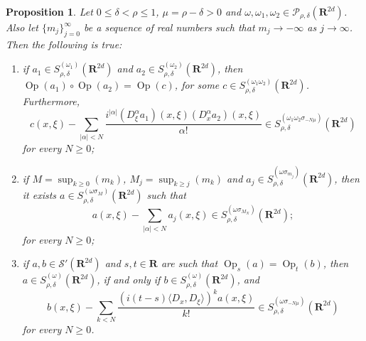 \documentclass[12pt,a4paper,reqno]{amsart}
\numberwithin{equation}{section}
\numberwithin{thm}{section}
\newtheorem{prop}[thm]{Proposition}
\theoremstyle{definition}
\theoremstyle{remark}
\begin{document}
\begin{prop}\label{pseudocomp}
Let  $0\le \delta <\rho \le 1$, $\mu =\rho -\delta >0$ and
$\omega ,\omega _1,\omega _2\in \mathscr P_{\rho ,\delta }({\mathbf R^{{2d}}})$. Also let $\{ m_j\} _{j=0}^{\infty}$ be a sequence of real
numbers such that $m_j\to -\infty$ as $j\to \infty$. Then the
following is true:
\begin{enumerate}
\item if $a_1\in S^{(\omega _1)}_{\rho ,\delta }({\mathbf R^{{2d}}})$ and
$a_2\in S^{(\omega _2)}_{\rho ,\delta }({\mathbf R^{{2d}}})$, then ${\operatorname{Op}}
(a_1)\circ {\operatorname{Op}} (a_2)={\operatorname{Op}} (c)$, for some $c\in S^{(\omega
_1\omega _2)}_{\rho ,\delta }({\mathbf R^{{2d}}})$. Furthermore,
\begin{equation}\label{symbcomp}
c(x,\xi )-\sum _{|\alpha |<N}\frac {i^{|\alpha |}(D^{\alpha}_\xi
a_1)(x,\xi )(D^{\alpha}_x a_2)(x,\xi )}{\alpha
!}\in S^{(\omega
_1\omega _2\sigma _{-N\mu })}_{\rho ,\delta }({\mathbf R^{{2d}}})
\end{equation}
for every $N\ge0$;

{\vspace{0.1cm}}

\item if $M=\sup _{k\ge 0}(m_k)$,
$M_j=\sup _{k\ge j}(m_k)$ and $a_j\in S^{(\omega \sigma _{m_j})}_{\rho
,\delta }({\mathbf R^{{2d}}})$, then it exists $a\in S^{(\omega \sigma
_{M})}_{\rho ,\delta }({\mathbf R^{{2d}}})$ such that
\begin{equation}\label{asymptexp}
a(x,\xi )-\sum _{|\alpha |<N}a_j(x,\xi )\in S^{(\omega 
\sigma _{M_N})}_{\rho ,\delta }({\mathbf R^{{2d}}});
\end{equation}
for every $N\ge 0$;

{\vspace{0.1cm}}

\item if $a,b\in \mathscr S'({\mathbf R^{{2d}}})$ and $s,t\in \mathbf R$ are
such that ${\operatorname{Op}} _s(a)={\operatorname{Op}} _t(b)$, then $a\in S^{(\omega )}_{\rho
,\delta }({\mathbf R^{{2d}}})$, if and only if $b\in S^{(\omega )}_{\rho ,\delta
}({\mathbf R^{{2d}}})$, and
\begin{equation}\label{pseudorel2}
b(x,\xi )-\sum _{k<N}\frac {(i(t-s){\langle {D_x},{D_\xi}\rangle})^{k}a(x,\xi )}{k
!}\in S^{(\omega \sigma _{-N\mu })}_{\rho ,\delta }({\mathbf R^{{2d}}})
\end{equation}
for every $N\ge 0$.
\end{enumerate}
\end{prop}
\end{document}
